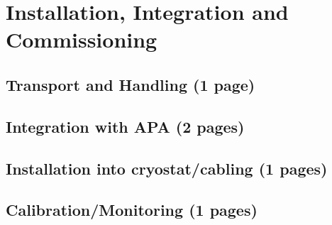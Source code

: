\section{Installation, Integration and Commissioning}
\label{sec:fdsp-pd-install}

\subsection{Transport and Handling (1 page)}
\label{sec:fdsp-pd-install-transport}


\subsection{Integration with APA  (2 pages)}
\label{sec:fdsp-pd-install-pd-apa}

\subsection{Installation into cryostat/cabling  (1 pages)}
\label{sec:fdsp-pd-install-pd-cryo}

\subsection{Calibration/Monitoring  (1 pages)}
\label{sec:fdsp-pd-install-calib}

